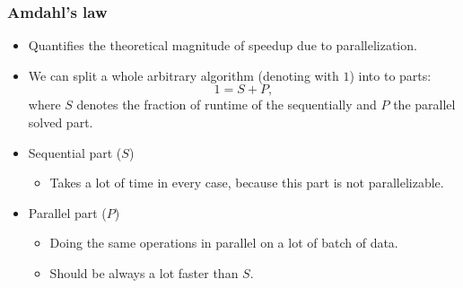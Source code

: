 \begin{frame}
\frametitle{Amdahl's law}

\begin{itemize}
	\item<1-> Quantifies the theoretical magnitude of speedup due to parallelization.
	\item<2-> We can split a whole arbitrary algorithm (denoting with $1$) into to parts:
	\begin{equation} \label{eq:1}
		1 = S + P,
	\end{equation}
	where $S$ denotes the fraction of runtime of the sequentially and $P$ the parallel solved part.
	\item<3-> Sequential part ($S$)
	\begin{itemize}
		\item<3-> Takes a lot of time in every case, because this part is not parallelizable.
	\end{itemize}
	\item<4-> Parallel part ($P$)
	\begin{itemize}
		\item<4-> Doing the same operations in parallel on a lot of batch of data.
		\item<4-> Should be always a lot faster than $S$.
	\end{itemize}
\end{itemize}

\end{frame}